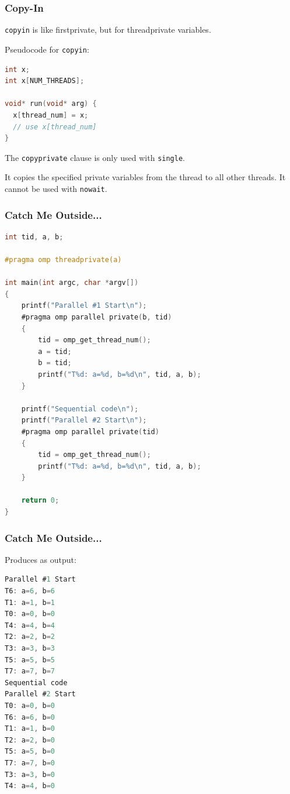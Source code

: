 \begin{frame}[fragile]
\frametitle{Copy-In}

{\tt copyin} is like firstprivate, but for threadprivate variables.

Pseudocode for {\tt copyin}:
  \begin{lstlisting}[language=C]
int x;
int x[NUM_THREADS];

void* run(void* arg) {
  x[thread_num] = x;
  // use x[thread_num]
}
  \end{lstlisting}

The {\tt copyprivate} clause is only used with {\tt single}.


It copies the specified private variables from the thread to all other
threads. It cannot be used with {\tt nowait}.

\end{frame}



\begin{frame}[fragile]
\frametitle{Catch Me Outside...}

\begin{lstlisting}[language=C,morekeywords={foreach,pragma,omp,parallel,single,nowait,task,untied,barrier,taskyield}]
int tid, a, b;

#pragma omp threadprivate(a)

int main(int argc, char *argv[])
{
    printf("Parallel #1 Start\n");
    #pragma omp parallel private(b, tid)
    {
        tid = omp_get_thread_num();
        a = tid;
        b = tid;
        printf("T%d: a=%d, b=%d\n", tid, a, b);
    }

    printf("Sequential code\n");
    printf("Parallel #2 Start\n");
    #pragma omp parallel private(tid)
    {
        tid = omp_get_thread_num();
        printf("T%d: a=%d, b=%d\n", tid, a, b);
    }

    return 0;
}    
  \end{lstlisting}

\end{frame}


\begin{frame}[fragile]
\frametitle{Catch Me Outside...}

Produces as output: 
\begin{lstlisting}[language=C,morekeywords={foreach,pragma,omp,parallel,single,nowait,task,untied,barrier,taskyield}]
% ./a.out
Parallel #1 Start
T6: a=6, b=6
T1: a=1, b=1
T0: a=0, b=0
T4: a=4, b=4
T2: a=2, b=2
T3: a=3, b=3
T5: a=5, b=5
T7: a=7, b=7
Sequential code
Parallel #2 Start
T0: a=0, b=0
T6: a=6, b=0
T1: a=1, b=0
T2: a=2, b=0
T5: a=5, b=0
T7: a=7, b=0
T3: a=3, b=0
T4: a=4, b=0
\end{lstlisting}



\end{frame}



